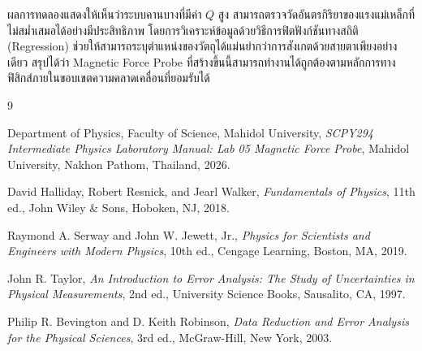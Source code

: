\documentclass[11pt,a4paper]{article}
\begin{document}
ผลการทดลองแสดงให้เห็นว่าระบบคานบางที่มีค่า $Q$ สูง สามารถตรวจวัดอันตรกิริยาของแรงแม่เหล็กที่ไม่สม่ำเสมอได้อย่างมีประสิทธิภาพ โดยการวิเคราะห์ข้อมูลด้วยวิธีการฟิตฟังก์ชันทางสถิติ (Regression) ช่วยให้สามารถระบุตำแหน่งของวัตถุได้แม่นยำกว่าการสังเกตด้วยสายตาเพียงอย่างเดียว สรุปได้ว่า Magnetic Force Probe ที่สร้างขึ้นนี้สามารถทำงานได้ถูกต้องตามหลักการทางฟิสิกส์ภายในขอบเขตความคลาดเคลื่อนที่ยอมรับได้


\newpage
\begin{thebibliography}{9}

Department of Physics, Faculty of Science, Mahidol University,
\textit{SCPY294 Intermediate Physics Laboratory Manual: Lab 05 Magnetic Force Probe},
Mahidol University, Nakhon Pathom, Thailand, 2026.

David Halliday, Robert Resnick, and Jearl Walker,
\textit{Fundamentals of Physics},
11th ed.,
John Wiley \& Sons, Hoboken, NJ, 2018.

Raymond A. Serway and John W. Jewett, Jr.,
\textit{Physics for Scientists and Engineers with Modern Physics},
10th ed.,
Cengage Learning, Boston, MA, 2019.

John R. Taylor,
\textit{An Introduction to Error Analysis: The Study of Uncertainties in Physical Measurements},
2nd ed.,
University Science Books, Sausalito, CA, 1997.

Philip R. Bevington and D. Keith Robinson,
\textit{Data Reduction and Error Analysis for the Physical Sciences},
3rd ed.,
McGraw-Hill, New York, 2003.

\end{thebibliography}
\end{document}
